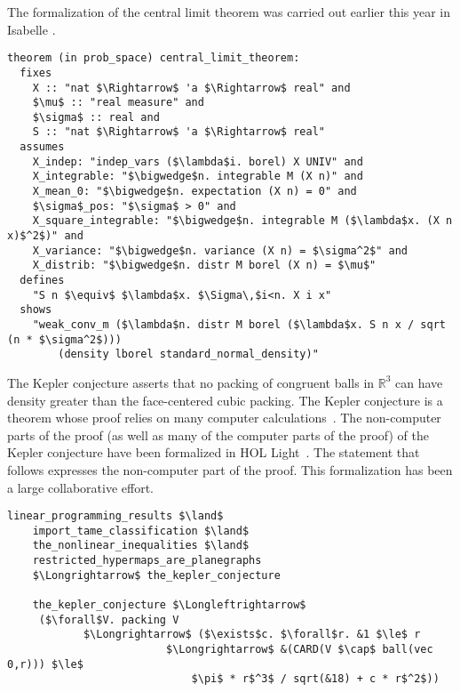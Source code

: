 \documentclass[brochure,english,12pt]{bourbaki}
\theoremstyle{plain}
\def\ring#1{{\mathbb{#1}}}
\begin{document}
The formalization of the central limit theorem was carried out earlier this year in Isabelle \cite{avigad2014central}.

\begin{lstlisting}[keepspaces=true,stringstyle=\tt,basicstyle=\small,frame=single,framesep=8pt,mathescape,morekeywords={theorem,fixes,assumes,defines,shows,Variable,Theorem,Proof,Qed},columns=flexible]
theorem (in prob_space) central_limit_theorem:
  fixes 
    X :: "nat $\Rightarrow$ 'a $\Rightarrow$ real" and
    $\mu$ :: "real measure" and
    $\sigma$ :: real and
    S :: "nat $\Rightarrow$ 'a $\Rightarrow$ real"
  assumes
    X_indep: "indep_vars ($\lambda$i. borel) X UNIV" and
    X_integrable: "$\bigwedge$n. integrable M (X n)" and
    X_mean_0: "$\bigwedge$n. expectation (X n) = 0" and
    $\sigma$_pos: "$\sigma$ > 0" and
    X_square_integrable: "$\bigwedge$n. integrable M ($\lambda$x. (X n x)$^2$)" and
    X_variance: "$\bigwedge$n. variance (X n) = $\sigma^2$" and
    X_distrib: "$\bigwedge$n. distr M borel (X n) = $\mu$"
  defines
    "S n $\equiv$ $\lambda$x. $\Sigma\,$i<n. X i x"
  shows
    "weak_conv_m ($\lambda$n. distr M borel ($\lambda$x. S n x / sqrt (n * $\sigma^2$))) 
        (density lborel standard_normal_density)"
\end{lstlisting}



The Kepler conjecture asserts that no packing of congruent balls in
$\ring{R}^3$ can have density greater than the face-centered cubic
packing.  The Kepler conjecture is a theorem whose proof relies on
many computer calculations~\cite{Hales:2006:DCG}.  The non-computer
parts of the proof (as well as many of the computer parts of the
proof) of the Kepler conjecture have been formalized in HOL
Light~\cite{website:FlyspeckProject}.  The statement that follows
expresses the non-computer part of the proof.  This formalization has
been a large collaborative effort.

\begin{lstlisting}[keepspaces=true,stringstyle=\tt,basicstyle=\small,frame=single,framesep=8pt,framextopmargin=10pt,mathescape,morekeywords={Variable,Theorem,Proof,Qed},columns=flexible]
    linear_programming_results $\land$      
    import_tame_classification $\land$      
    the_nonlinear_inequalities $\land$
    restricted_hypermaps_are_planegraphs    
    $\Longrightarrow$ the_kepler_conjecture

    the_kepler_conjecture $\Longleftrightarrow$
     ($\forall$V. packing V
            $\Longrightarrow$ ($\exists$c. $\forall$r. &1 $\le$ r
                         $\Longrightarrow$ &(CARD(V $\cap$ ball(vec 0,r))) $\le$
                             $\pi$ * r$^3$ / sqrt(&18) + c * r$^2$))
\end{lstlisting}
\end{document}

